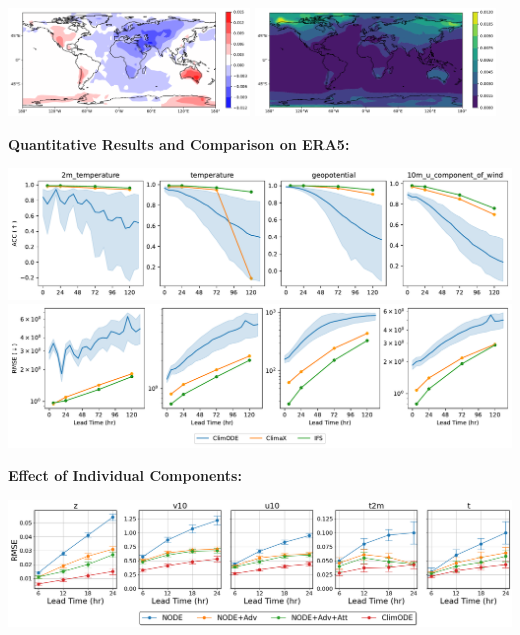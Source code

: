 \documentclass[landscape,a1paper,fontscale=0.424]{baposter}
\begin{document}
\begin{poster}
{\begin{minipage}[t]{0.50\textwidth}
\begin{center}
                \includegraphics[width=0.48\textwidth]{mu.pdf}
                \includegraphics[width=0.48\textwidth]{std.pdf}
            \end{center}

            \textbf{\color{blue}Quantitative Results and Comparison on ERA5:}
            \vspace{-0.5em}
            \begin{center}
                \includegraphics[width=\textwidth]{acc.pdf}
                \includegraphics[width=\textwidth]{rmse.pdf}
            \end{center}
        \end{minipage}\hfill
        \begin{minipage}[t]{0.50\textwidth}
            \textbf{\color{blue}Effect of Individual Components:}
            \vspace{-0.5em}
            \begin{center}
                \includegraphics[width=\textwidth]{ablation.png}
            \end{center}


\end{minipage}}
\end{poster}
\end{document}
